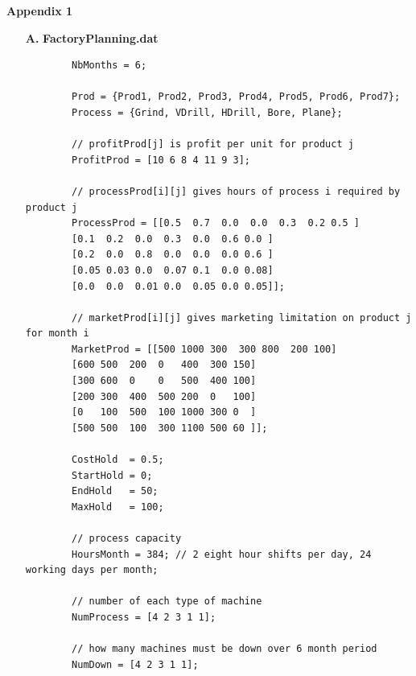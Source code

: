 \documentclass[12pt,a4paper]{article}
\theoremstyle{definition}
\begin{document}
{\noindent\large\textbf{Appendix 1}}
\begin{enumerate}
	\item [\textbf{A.}]
	\textbf{FactoryPlanning.dat}
	\begin{lstlisting}
		NbMonths = 6;
		
		Prod = {Prod1, Prod2, Prod3, Prod4, Prod5, Prod6, Prod7};
		Process = {Grind, VDrill, HDrill, Bore, Plane};
		
		// profitProd[j] is profit per unit for product j
		ProfitProd = [10 6 8 4 11 9 3];
		
		// processProd[i][j] gives hours of process i required by product j
		ProcessProd = [[0.5  0.7  0.0  0.0  0.3  0.2 0.5 ]
		[0.1  0.2  0.0  0.3  0.0  0.6 0.0 ]
		[0.2  0.0  0.8  0.0  0.0  0.0 0.6 ]
		[0.05 0.03 0.0  0.07 0.1  0.0 0.08]
		[0.0  0.0  0.01 0.0  0.05 0.0 0.05]];
		
		// marketProd[i][j] gives marketing limitation on product j for month i
		MarketProd = [[500 1000 300  300 800  200 100]
		[600 500  200  0   400  300 150]
		[300 600  0    0   500  400 100]
		[200 300  400  500 200  0   100]
		[0   100  500  100 1000 300 0  ]
		[500 500  100  300 1100 500 60 ]];
		
		CostHold  = 0.5;
		StartHold = 0;
		EndHold   = 50;
		MaxHold   = 100;
		
		// process capacity
		HoursMonth = 384; // 2 eight hour shifts per day, 24 working days per month;
		
		// number of each type of machine
		NumProcess = [4 2 3 1 1];
		
		// how many machines must be down over 6 month period
		NumDown = [4 2 3 1 1];
	\end{lstlisting}
\end{enumerate}
\end{document}
